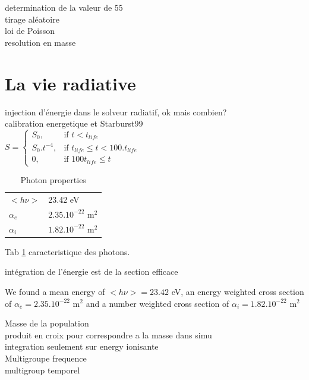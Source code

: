 determination de la valeur de 55\\

tirage aléatoire\\
loi de Poisson\\

resolution en masse\\



\section{La vie radiative}

injection d'énergie dans le solveur radiatif, ok mais combien?\\
calibration energetique et Starburst99\\


$
    S = 
\begin{cases}
    S_0 ,         & \text{if } t < t_{life}\\
    S_0.t^{-4},   & \text{if } t_{life} \leq t < 100.t_{life} \\
    0,   & \text{if } 100t_{life} \leq t
\end{cases}
$


\begin{table}
\begin{tabular}{|l|l|}
  \hline
	$<h\nu>$	&  23.42 eV \\
	$\alpha_e$	&  $2.35.10^{-22}$ m$^2$ \\
	$\alpha_i$	&  $1.82.10^{-22}$ m$^2$ \\
  \hline
\end{tabular}
\caption{Photon properties
\label{tab_photon}}
\end{table}

Tab \ref{tab_photon} caracteristique des photons.


intégration de l'énergie est de la section efficace


We found a mean energy of $<h\nu> = 23.42$ eV,
an energy weighted cross section of
$\alpha_e = 2.35.10^{-22}$ m$^2$
and a number weighted cross section of
$\alpha_i = 1.82.10^{-22}$ m$^2$



Masse de la population\\
produit en croix pour correspondre a la masse dans simu\\
integration seulement sur energy ionisante\\

Multigroupe frequence\\
multigroup temporel\\


